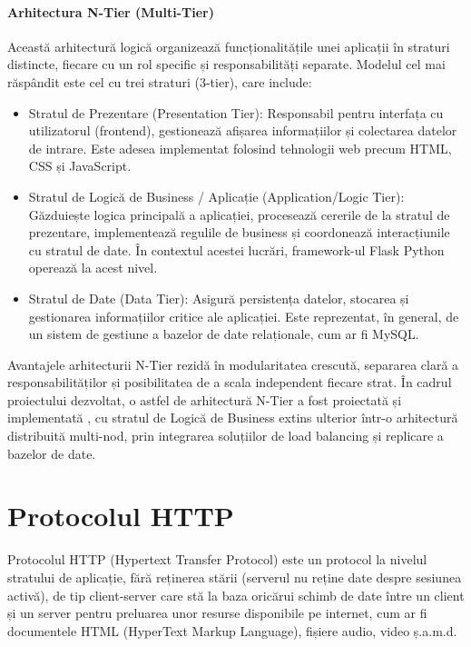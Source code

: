 \documentclass[12pt, a4paper, oneside, romanian]{teza-upb}
\begin{document}
	\paragraph{Arhitectura N-Tier (Multi-Tier)}
	Această arhitectură logică \cite{n} organizează funcționalitățile unei aplicații în straturi distincte, fiecare cu un rol specific și responsabilități separate. Modelul cel mai răspândit este cel cu trei straturi (3-tier), care include:
	\begin{itemize}
		\item Stratul de Prezentare (Presentation Tier): Responsabil pentru interfața cu utilizatorul (frontend), gestionează afișarea informațiilor și colectarea datelor de intrare. Este adesea implementat folosind tehnologii web precum HTML, CSS și JavaScript.
		\item Stratul de Logică de Business / Aplicație (Application/Logic Tier): Găzduiește logica principală a aplicației, procesează cererile de la stratul de prezentare, implementează regulile de business și coordonează interacțiunile cu stratul de date. În contextul acestei lucrări, framework-ul Flask Python operează la acest nivel.
		\item Stratul de Date (Data Tier): Asigură persistența datelor, stocarea și gestionarea informațiilor critice ale aplicației. Este reprezentat, în general, de un sistem de gestiune a bazelor de date relaționale, cum ar fi MySQL.
	\end{itemize}
	
	Avantajele arhitecturii N-Tier rezidă în modularitatea crescută, separarea clară a responsabilităților și posibilitatea de a scala independent fiecare strat. În cadrul proiectului dezvoltat, o astfel de arhitectură N-Tier a fost proiectată și implementată , cu stratul de Logică de Business extins ulterior într-o arhitectură distribuită multi-nod, prin integrarea soluțiilor de load balancing și replicare a bazelor de date.
	
	
	\section {Protocolul HTTP}

	
	Protocolul HTTP (Hypertext Transfer Protocol) \cite{http} este un protocol la nivelul stratului de aplicație, fără reținerea stării (serverul nu reține date despre sesiunea activă), de tip client-server care stă la baza oricărui schimb de date între un client și un server pentru preluarea unor resurse disponibile pe internet, cum ar fi documentele HTML (HyperText Markup Language), fișiere audio, video ș.a.m.d. 
	
\end{document}
